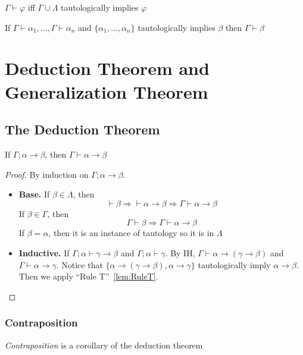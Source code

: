 \begin{lemma}
    $\Gamma\vdash\varphi$ iff $\Gamma\cup\Lambda$ tautologically implies $\varphi$
\end{lemma}

\begin{lemma}
    \label{lem:RuleT}
    If $\Gamma\vdash\alpha_1,\dots,\Gamma\vdash\alpha_n$ and $\{\alpha_1,\dots,\alpha_n\}$ tautologically implies $\beta$ then $\Gamma\vdash\beta$
\end{lemma}

\section{Deduction Theorem and Generalization Theorem}

\subsection{The Deduction Theorem}

\begin{theorem}
    \label{thm:DeductionTheorem}
    If $\Gamma;\alpha\to\beta$, then $\Gamma\vdash\alpha\to\beta$
\end{theorem}
\begin{proof}
    By induction on $\Gamma;\alpha\to\beta$.
    \begin{itemize}
        \item[] \textbf{Base.} If $\beta\in\Lambda$, then
        \[ \vdash\beta \Rightarrow \vdash \alpha\to\beta \Rightarrow \Gamma\vdash\alpha\to\beta \]
        If $\beta\in\Gamma$, then
        \[ \Gamma\vdash\beta \Rightarrow \Gamma\vdash\alpha\to\beta \]
        If $\beta=\alpha$, then it is an instance of tautology so it is in $\Lambda$
        \item[] \textbf{Inductive.} If $\Gamma;\alpha\vdash\gamma\to\beta$ and $\Gamma;\alpha\vdash\gamma$. By IH, $\Gamma\vdash\alpha\to(\gamma\to\beta)$ and $\Gamma\vdash\alpha\to\gamma$. Notice that $\{ \alpha\to(\gamma\to\beta), \alpha\to\gamma \}$ tautologically imply $\alpha\to\beta$. Then we apply ``Rule T''~\ref{lem:RuleT}.
    \end{itemize}
\end{proof}

\subsubsection{Contraposition}

\emph{Contraposition} is a corollary of the deduction theorem

